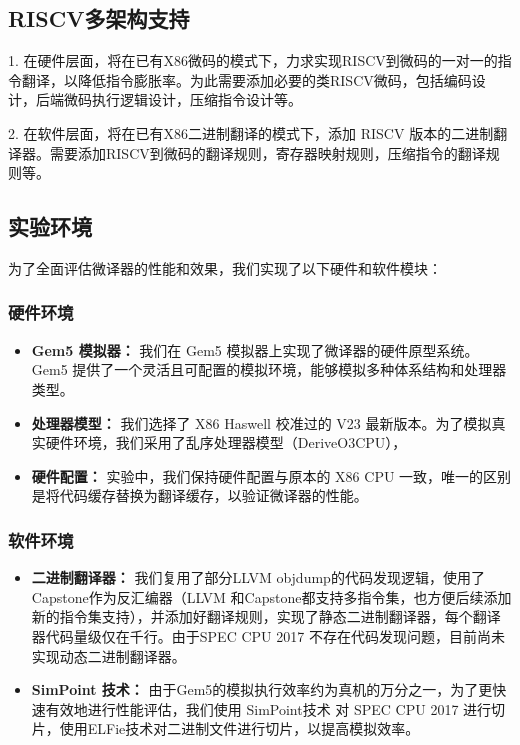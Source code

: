 \documentclass{Style/ucasproposal}%
\begin{document}
\subsection{RISCV多架构支持}

1. 在硬件层面，将在已有X86微码的模式下，力求实现RISCV到微码的一对一的指令翻译，以降低指令膨胀率。为此需要添加必要的类RISCV微码，包括编码设计，后端微码执行逻辑设计，压缩指令设计等。

2. 在软件层面，将在已有X86二进制翻译的模式下，添加 RISCV 版本的二进制翻译器。需要添加RISCV到微码的翻译规则，寄存器映射规则，压缩指令的翻译规则等。


\subsection{实验环境}

为了全面评估微译器的性能和效果，我们实现了以下硬件和软件模块：

\subsubsection{硬件环境}

\begin{itemize}
  \item \textbf{Gem5 模拟器：} 我们在 Gem5 模拟器\cite{Gem5SimulatorVersion2020}上实现了微译器的硬件原型系统。Gem5 提供了一个灵活且可配置的模拟环境，能够模拟多种体系结构和处理器类型。

  \item \textbf{处理器模型：} 我们选择了 X86 Haswell\cite{akramValidationGem5Simulator2019} 校准过的 V23 最新版本。为了模拟真实硬件环境，我们采用了乱序处理器模型（DeriveO3CPU），

  \item \textbf{硬件配置：} 实验中，我们保持硬件配置与原本的 X86 CPU 一致，唯一的区别是将代码缓存替换为翻译缓存，以验证微译器的性能。
\end{itemize}

\subsubsection{软件环境}

\begin{itemize}
  \item \textbf{二进制翻译器：} 我们复用了部分LLVM objdump\cite{llvm_project}的代码发现逻辑，使用了Capstone\cite{CapstoneEngine2023}作为反汇编器（LLVM 和Capstone都支持多指令集，也方便后续添加新的指令集支持），并添加好翻译规则，实现了静态二进制翻译器，每个翻译器代码量级仅在千行。由于SPEC CPU 2017 不存在代码发现问题，目前尚未实现动态二进制翻译器。

  \item \textbf{SimPoint 技术：} 由于Gem5的模拟执行效率约为真机的万分之一，为了更快速有效地进行性能评估，我们使用 SimPoint技术\cite{sherwoodAutomaticallyCharacterizingLarge2002} 对 SPEC CPU 2017 进行切片，使用ELFie技术\cite{patilELFiesExecutableRegion2021}对二进制文件进行切片，以提高模拟效率。
\end{itemize}
\end{document}

